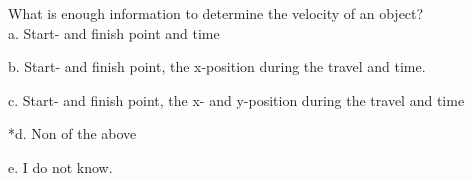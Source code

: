
What is enough information to determine the velocity of an object?\\

a. Start- and finish point and time

b. Start- and finish point, the x-position during the travel and time.

c. Start- and finish point, the x- and y-position during the travel and time

*d. Non of the above 

e. I do not know. \\
